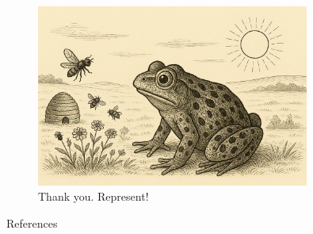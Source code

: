 \documentclass[10pt, aspectratio=169]{beamer}
\begin{document}
    
    \begin{frame}
        \begin{figure}[h!]
            \centering
            \includegraphics[width=0.8\textwidth]{images/frog_world.png}
            \caption{\Huge Thank you. Represent! }
            
        \end{figure}
      
    \end{frame}
    
    

    \begin{frame}[allowframebreaks]{References}
   \small
        \printbibliography
    \end{frame}



        
\end{document}
